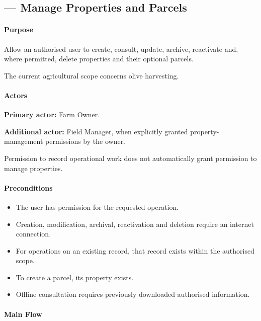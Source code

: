 \subsection{ --- Manage Properties and Parcels}
\label{uc:05}

\paragraph{Purpose}

Allow an authorised user to create, consult, update,
archive, reactivate and, where permitted, delete
properties and their optional parcels.

The current agricultural scope concerns
olive harvesting.


\paragraph{Actors}

\textbf{Primary actor:} Farm Owner.

\textbf{Additional actor:} Field Manager,
when explicitly granted property-management
permissions by the owner.

Permission to record operational work does not
automatically grant permission to manage properties.

\paragraph{Preconditions}

\begin{itemize}
    \item The user has permission for
    the requested operation.
    \item Creation, modification, archival,
    reactivation and deletion require
    an internet connection.
    \item For operations on an existing record,
    that record exists within the authorised scope.
    \item To create a parcel, its property exists.
    \item Offline consultation requires
    previously downloaded authorised information.
\end{itemize}

\paragraph{Main Flow}


